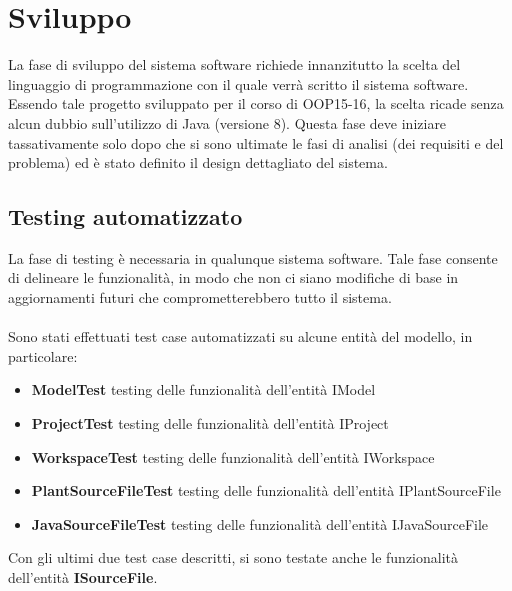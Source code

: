 \documentclass{article}
\begin{document}
  \section{Sviluppo}
  La fase di sviluppo del sistema software richiede innanzitutto la scelta del linguaggio di programmazione con il quale verrà scritto il sistema software.
  Essendo tale progetto sviluppato per il corso di OOP15-16, la scelta ricade senza alcun dubbio sull'utilizzo di Java (versione 8).
  Questa fase deve iniziare tassativamente solo dopo che si sono ultimate le fasi di analisi (dei requisiti e del problema) ed è stato definito il design dettagliato
  del sistema.\\
  \subsection{Testing automatizzato}
  La fase di testing è necessaria in qualunque sistema software. Tale fase consente di delineare le funzionalità, in modo che non ci siano modifiche di base in aggiornamenti
  futuri che comprometterebbero tutto il sistema.\\
  \\Sono stati effettuati test case automatizzati su alcune entità del modello, in particolare:
  \begin{itemize}
    \item \textbf{ModelTest} testing delle funzionalità dell'entità IModel
    \item \textbf{ProjectTest} testing delle funzionalità dell'entità IProject
    \item \textbf{WorkspaceTest} testing delle funzionalità dell'entità IWorkspace
    \item \textbf{PlantSourceFileTest} testing delle funzionalità dell'entità IPlantSourceFile
    \item \textbf{JavaSourceFileTest} testing delle funzionalità dell'entità IJavaSourceFile
  \end{itemize}
  Con gli ultimi due test case descritti, si sono testate anche le funzionalità dell'entità \textbf{ISourceFile}.
\end{document}
